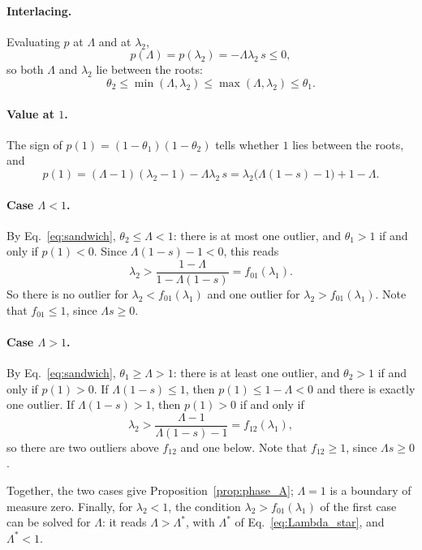 \paragraph{Interlacing.} Evaluating $p$ at $\Lambda$ and at $\lambda_2$,
\[
    p(\Lambda) = p(\lambda_2) = -\Lambda\lambda_2\, s \le 0 ,
\]
so both $\Lambda$ and $\lambda_2$ lie between the roots:
\begin{equation}
    \theta_2 \le \min(\Lambda, \lambda_2) \le \max(\Lambda, \lambda_2) \le \theta_1 .
    \label{eq:sandwich}
\end{equation}

\paragraph{Value at $1$.} The sign of $p(1) = (1-\theta_1)(1-\theta_2)$ tells whether $1$ lies between the roots, and
\[
    p(1) = (\Lambda-1)(\lambda_2-1) - \Lambda\lambda_2\, s = \lambda_2\big(\Lambda(1-s) - 1\big) + 1 - \Lambda .
\]

\paragraph{Case $\Lambda < 1$.} By Eq.~\eqref{eq:sandwich}, $\theta_2 \le \Lambda < 1$: there is at most one outlier, and $\theta_1 > 1$ if and only if $p(1) < 0$. Since $\Lambda(1-s) - 1 < 0$, this reads
\[
    \lambda_2 > \frac{1-\Lambda}{1-\Lambda(1-s)} = f_{01}(\lambda_1) .
\]
So there is no outlier for $\lambda_2 < f_{01}(\lambda_1)$ and one outlier for $\lambda_2 > f_{01}(\lambda_1)$. Note that $f_{01} \le 1$, since $\Lambda s \ge 0$.

\paragraph{Case $\Lambda > 1$.} By Eq.~\eqref{eq:sandwich}, $\theta_1 \ge \Lambda > 1$: there is at least one outlier, and $\theta_2 > 1$ if and only if $p(1) > 0$. If $\Lambda(1-s) \le 1$, then $p(1) \le 1 - \Lambda < 0$ and there is exactly one outlier. If $\Lambda(1-s) > 1$, then $p(1) > 0$ if and only if
\[
    \lambda_2 > \frac{\Lambda-1}{\Lambda(1-s)-1} = f_{12}(\lambda_1) ,
\]
so there are two outliers above $f_{12}$ and one below. Note that $f_{12} \ge 1$, since $\Lambda s \ge 0$.

\noindent
Together, the two cases give Proposition~\ref{prop:phase_A}; $\Lambda = 1$ is a boundary of measure zero. Finally, for $\lambda_2 < 1$, the condition $\lambda_2 > f_{01}(\lambda_1)$ of the first case can be solved for $\Lambda$: it reads $\Lambda > \Lambda^*$, with $\Lambda^*$ of Eq.~\eqref{eq:Lambda_star}, and $\Lambda^* < 1$.

